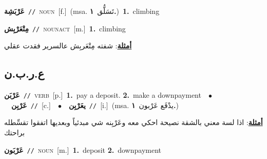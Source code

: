 \documentclass[10pt,a4paper,twoside]{article} %
\begin{document}
\begin{multicols}{2}
{\setlength\topsep{0pt}\textbf{\foreignlanguage{arabic}{عَرْبَشِة}}\ {\color{gray}\texttt{//}\color{black}}\ \textsc{noun}\ [f.]\ \color{gray}(msa. \foreignlanguage{arabic}{تَسَلُّق}~\foreignlanguage{arabic}{\textbf{١.}})\color{black}\ \textbf{1.}~climbing\ } \vspace{2mm}

{\setlength\topsep{0pt}\textbf{\foreignlanguage{arabic}{مِتْعَرْبِش}}\ {\color{gray}\texttt{//}\color{black}}\ \textsc{noun\textunderscore act}\ [m.]\ \textbf{1.}~climbing\  \begin{flushright}\color{gray}\foreignlanguage{arabic}{\textbf{\underline{\foreignlanguage{arabic}{أمثلة}}}: شفته مِتْعَربِش  عالسرير فقدت عقلي}\end{flushright}\color{black}} \vspace{2mm}

\vspace{-3mm}
\subsection*{\color{blue}\foreignlanguage{arabic}{ع.ر.ب.ن}\color{blue}{}} 

{\setlength\topsep{0pt}\textbf{\foreignlanguage{arabic}{عَرْبَن}}\ {\color{gray}\texttt{//}\color{black}}\ \textsc{verb}\ [p.]\ \textbf{1.}~pay a deposit.  \textbf{2.}~make a downpayment\ \ $\bullet$\ \ \setlength\topsep{0pt}\textbf{\foreignlanguage{arabic}{عَرْبِن}}\ {\color{gray}\texttt{//}\color{black}}\ [c.]\ \ $\bullet$\ \ \setlength\topsep{0pt}\textbf{\foreignlanguage{arabic}{يعَرْبِن}}\ {\color{gray}\texttt{//}\color{black}}\ [i.]\ \color{gray}(msa. \foreignlanguage{arabic}{يدْفَع عَرْبون}~\foreignlanguage{arabic}{\textbf{١.}})\color{black}\  \begin{flushright}\color{gray}\foreignlanguage{arabic}{\textbf{\underline{\foreignlanguage{arabic}{أمثلة}}}: اذا لسة معني بالشقة نصيحة احكي معه وعَرْبِنه شي مبدئياً وبعديها اتفقوا تقسِّطله براحتك}\end{flushright}\color{black}} \vspace{2mm}

{\setlength\topsep{0pt}\textbf{\foreignlanguage{arabic}{عَرْبَون}}\ {\color{gray}\texttt{//}\color{black}}\ \textsc{noun}\ [m.]\ \textbf{1.}~deposit  \textbf{2.}~downpayment\ } \vspace{2mm}


\end{multicols}
\end{document}
